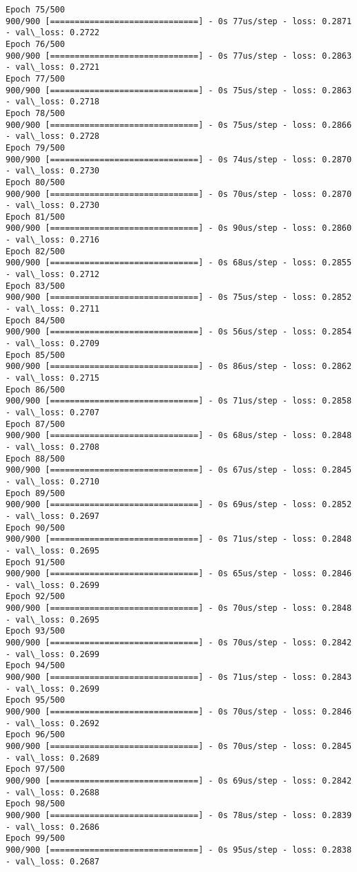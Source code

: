 \documentclass[11pt]{article}
\begin{document}
\begin{Verbatim}[commandchars=\\\{\}]
Epoch 75/500
900/900 [==============================] - 0s 77us/step - loss: 0.2871 - val\_loss: 0.2722
Epoch 76/500
900/900 [==============================] - 0s 77us/step - loss: 0.2863 - val\_loss: 0.2721
Epoch 77/500
900/900 [==============================] - 0s 75us/step - loss: 0.2863 - val\_loss: 0.2718
Epoch 78/500
900/900 [==============================] - 0s 75us/step - loss: 0.2866 - val\_loss: 0.2728
Epoch 79/500
900/900 [==============================] - 0s 74us/step - loss: 0.2870 - val\_loss: 0.2730
Epoch 80/500
900/900 [==============================] - 0s 70us/step - loss: 0.2870 - val\_loss: 0.2730
Epoch 81/500
900/900 [==============================] - 0s 90us/step - loss: 0.2860 - val\_loss: 0.2716
Epoch 82/500
900/900 [==============================] - 0s 68us/step - loss: 0.2855 - val\_loss: 0.2712
Epoch 83/500
900/900 [==============================] - 0s 75us/step - loss: 0.2852 - val\_loss: 0.2711
Epoch 84/500
900/900 [==============================] - 0s 56us/step - loss: 0.2854 - val\_loss: 0.2709
Epoch 85/500
900/900 [==============================] - 0s 86us/step - loss: 0.2862 - val\_loss: 0.2715
Epoch 86/500
900/900 [==============================] - 0s 71us/step - loss: 0.2858 - val\_loss: 0.2707
Epoch 87/500
900/900 [==============================] - 0s 68us/step - loss: 0.2848 - val\_loss: 0.2708
Epoch 88/500
900/900 [==============================] - 0s 67us/step - loss: 0.2845 - val\_loss: 0.2710
Epoch 89/500
900/900 [==============================] - 0s 69us/step - loss: 0.2852 - val\_loss: 0.2697
Epoch 90/500
900/900 [==============================] - 0s 71us/step - loss: 0.2848 - val\_loss: 0.2695
Epoch 91/500
900/900 [==============================] - 0s 65us/step - loss: 0.2846 - val\_loss: 0.2699
Epoch 92/500
900/900 [==============================] - 0s 70us/step - loss: 0.2848 - val\_loss: 0.2695
Epoch 93/500
900/900 [==============================] - 0s 70us/step - loss: 0.2842 - val\_loss: 0.2699
Epoch 94/500
900/900 [==============================] - 0s 71us/step - loss: 0.2843 - val\_loss: 0.2699
Epoch 95/500
900/900 [==============================] - 0s 70us/step - loss: 0.2846 - val\_loss: 0.2692
Epoch 96/500
900/900 [==============================] - 0s 70us/step - loss: 0.2845 - val\_loss: 0.2689
Epoch 97/500
900/900 [==============================] - 0s 69us/step - loss: 0.2842 - val\_loss: 0.2688
Epoch 98/500
900/900 [==============================] - 0s 78us/step - loss: 0.2839 - val\_loss: 0.2686
Epoch 99/500
900/900 [==============================] - 0s 95us/step - loss: 0.2838 - val\_loss: 0.2687

\end{Verbatim}
\end{document}
